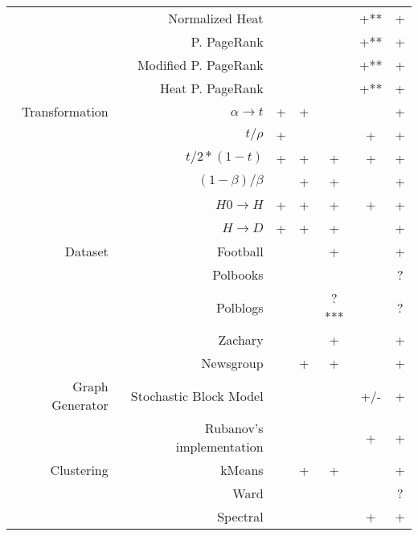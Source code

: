 \documentclass{article}
\begin{document}
\begin{table}[H]
\begin{tabular}{rr|cccc|c}
                & Normalized Heat          &            &          &        & +**         & \cellcolor{yellow!25} + \\
                & P. PageRank              &            &          &        & +**         & \cellcolor{yellow!25} + \\
                & Modified P. PageRank     &            &          &        & +**         & \cellcolor{yellow!25} + \\
                & Heat P. PageRank         &            &          &        & +**         & \cellcolor{yellow!25} + \\
                \cline{2-7}
Transformation  & $\alpha \rightarrow t$   & +          & +        &        &             & +      \\
                & $t / \rho$               & +          &          &        & +           & +      \\
                & $t / 2*(1 - t)$          & +          & +        & +      & +           & +      \\
                & $(1 - \beta) / \beta$    &            & +        & +      &             & +      \\
                & $H0 \rightarrow H$       & +          & +        & +      & +           & +      \\
                & $H \rightarrow D$        & +          & +        & +      &             & +      \\
                \cline{2-7}
Dataset         & Football                 &            &          & +      &             & +      \\
                & Polbooks                 &            &          &        &             & \cellcolor{yellow!25} ? \\
                & Polblogs                 &            &          & ?***   &             & \cellcolor{yellow!25} ? \\
                & Zachary                  &            &          & +      &             & +      \\
                & Newsgroup                &            & +        & +      &             & +      \\
                \cline{2-7}
Graph Generator & Stochastic Block Model   &            &          &        & \cellcolor{yellow!25} +/- & \cellcolor{yellow!25} + \\
                & Rubanov's implementation &            &          &        & +           & +      \\
                \cline{2-7}
Clustering      & kMeans                   &            & +        & +      &             & +      \\
                & Ward                     &            &          &        &             & \cellcolor{yellow!25} ? \\
                & Spectral                 &            &          &        & +           & +
\end{tabular}
\end{table}
\end{document}
